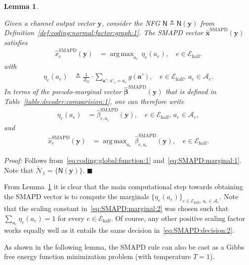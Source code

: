 \documentclass[journal, twocolumn]{IEEEtran}
\renewcommand{\mathbf}[1]{{\bm{#1}}}
\DeclareMathOperator*{\argmax}{arg\,max}
\newcommand{\vect}[1]{\mathbf{#1}}
\newcommand{\set}[1]{\mathcal{#1}}
\newcommand{\graph}[1]{\mathsf{#1}}
\newcommand{\defeq}{\triangleq}
\newcommand{\bel}{\beta}
\newcommand{\hbel}{\hat \bel}
\newcommand{\hvbel}{\boldsymbol{\hat \bel}}
\newcommand{\setA}{\set{A}}
\newcommand{\setEhalf}{\set{E}_{\mathrm{half}}}
\newcommand{\va}{\vect{a}}
\newcommand{\SMAPD}{\mathrm{SMAPD}}
\newcommand{\hvxSMAPD}{\vect{\hat x}^{\mathrm{SMAPD}}}
\newcommand{\hxSMAPD}{\hat x^{\mathrm{SMAPD}}}
\newcommand{\vy}{\vect{y}}
\newcommand{\graphN}{\graph{N}}
\newcommand{\cover}[1]{\tilde{#1}}
\newcommand{\cset}[1]{\cover{\set{#1}}}
\newcommand{\?}{\mathrm{?}}
\newcommand{\qedblack}{\hspace*{\fill}%
  $\blacksquare$\smallskip}
\newcommand{\ZGibbs}{Z_{\mathrm{G}}}
\newtheorem{Lemma}{Lemma}
\newenvironment{Proof}%
  {\noindent \emph{Proof:}}{\qedblack}
\begin{document}
\begin{Lemma}
  \label{lemma:SMAPD:reformulation:1}

  Given a channel output vector $\vy$, consider the NFG
  $\graphN \defeq \graphN(\vy)$ from
  Definition~\ref{def:coding:normal:factor:graph:1}. The SMAPD vector
  $\hvxSMAPD(\vy)$ satisfies
  \begin{align}
    \hxSMAPD_e(\vy)
      &= \argmax_{a_e} \,
           \eta_e(a_e),
             \quad e \in \setEhalf.
               \label{eq:SMAPD:decision:2}
  \end{align}
  with
  \begin{align}
    \eta_e(a_e)
      &\defeq
         \frac{1}{\ZGibbs}
         \cdot
         \sum_{\va': \, a'_e = a_e}
           g(\va'),
             \quad e \in \setEhalf, \, a_e \in \setA_e.
             \label{eq:SMAPD:marginal:2}
  \end{align}
  In terms of the pseudo-marginal vector $\hvbel^{\SMAPD}(\vy)$ that is
  defined in Table~\ref{table:decoder:comparision:1}, one can therefore write
  \begin{align*}
    \eta_e(a_e)
      &= \hbel_{e,a_e}^{\SMAPD}(\vy),
           \quad e \in \setEhalf, \, a_e \in \setA_e,
  \end{align*}
  and
  \begin{align*}
    \hxSMAPD_e(\vy)
      &= \argmax_{a_e} \,
           \hbel_{e,a_e}^{\SMAPD}(\vy),
             \quad e \in \setEhalf.
  \end{align*}
\end{Lemma}


\begin{Proof}
  Follows from~\eqref{eq:coding:global:function:1}
  and~\eqref{eq:SMAPD:marginal:1}. Note that $\cset{N}_1 = \bigl\{
  \graphN(\vy) \bigr\}$.
\end{Proof}


From Lemma~\ref{lemma:SMAPD:reformulation:1} it is clear that the main
computational step towards obtaining the SMAPD vector is to compute the
marginals $\bigl\{ \eta_e(a_e) \bigr\}_{e \in \setEhalf, \, a_e \in
  \setA_e}$. Note that the scaling constant in~\eqref{eq:SMAPD:marginal:2} was
chosen such that $\sum_{a_e} \eta_e(a_e) = 1$ for every $e \in \setEhalf$. Of
course, any other positive scaling factor works equally well as it entails the
same decision in~\eqref{eq:SMAPD:decision:2}.


As shown in the following lemma, the SMAPD rule can also be cast as a Gibbs
free energy function minimization problem (with temperature $T = 1$). 
\end{document}
